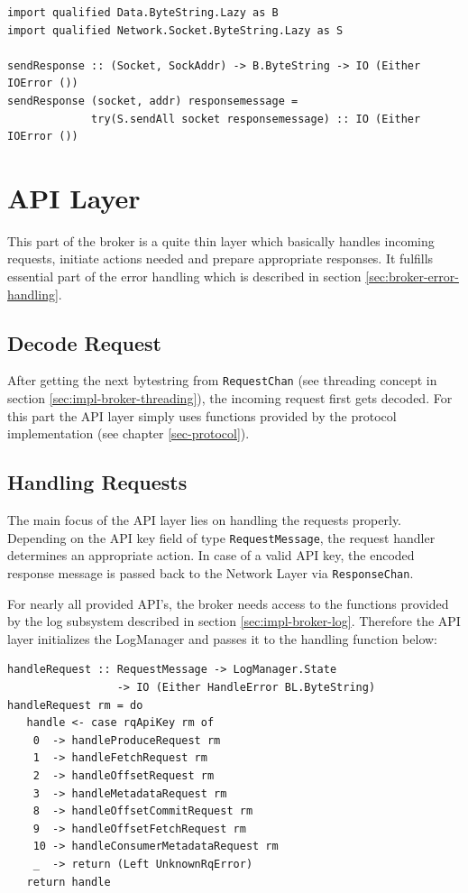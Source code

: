 \begin{lstlisting}[caption={Send data via socket}]
import qualified Data.ByteString.Lazy as B
import qualified Network.Socket.ByteString.Lazy as S

sendResponse :: (Socket, SockAddr) -> B.ByteString -> IO (Either IOError ())
sendResponse (socket, addr) responsemessage = 
             try(S.sendAll socket responsemessage) :: IO (Either IOError ())
\end{lstlisting}

\newpage
\section{API Layer}
\label{sec:broker-api}
This part of the broker is a quite thin layer which basically handles incoming
requests, initiate actions needed and prepare appropriate responses. It fulfills
essential part of the error handling which is described in section 
\ref{sec:broker-error-handling}. 

\subsection{Decode Request}
\label{sec:impl-broker-api-handle}
After getting the next bytestring from \lstinline{RequestChan} (see threading
concept in section \ref{sec:impl-broker-threading}), the incoming request first
gets decoded. For this part the API layer simply uses functions provided by the
protocol implementation (see chapter \ref{sec-protocol}).

\subsection{Handling Requests}
The main focus of the API layer lies on handling the
requests properly. Depending on the API key field of type
\lstinline{RequestMessage}, the
request handler determines an appropriate action. In case of a valid API key,
the encoded response message is passed back to the Network Layer via
\lstinline{ResponseChan}.

For nearly all provided API's, the broker needs access to the functions provided
by the log subsystem described in section \ref{sec:impl-broker-log}. Therefore the
API layer initializes the LogManager and passes it to the handling function
below:
\begin{lstlisting}[caption={Handling requests depending on ApiKey}]
handleRequest :: RequestMessage -> LogManager.State 
                 -> IO (Either HandleError BL.ByteString)
handleRequest rm = do
   handle <- case rqApiKey rm of
    0  -> handleProduceRequest rm
    1  -> handleFetchRequest rm
    2  -> handleOffsetRequest rm
    3  -> handleMetadataRequest rm
    8  -> handleOffsetCommitRequest rm
    9  -> handleOffsetFetchRequest rm
    10 -> handleConsumerMetadataRequest rm
    _  -> return (Left UnknownRqError)
   return handle
\end{lstlisting}

